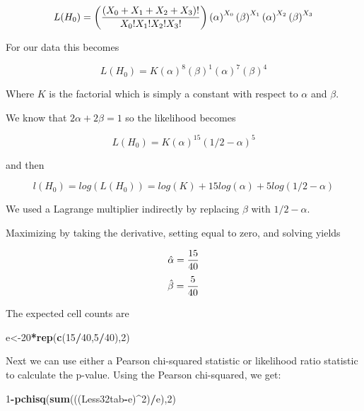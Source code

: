 \documentclass[]{book}
\newenvironment{Shaded}{\begin{snugshade}}{\end{snugshade}}
\newcommand{\KeywordTok}[1]{\textcolor[rgb]{0.13,0.29,0.53}{\textbf{#1}}}
\newcommand{\DecValTok}[1]{\textcolor[rgb]{0.00,0.00,0.81}{#1}}
\newcommand{\OperatorTok}[1]{\textcolor[rgb]{0.81,0.36,0.00}{\textbf{#1}}}
\newcommand{\NormalTok}[1]{#1}
\theoremstyle{definition}
\theoremstyle{definition}
\theoremstyle{definition}
\theoremstyle{remark}
\begin{document}
\[L(H_{0})= \left( {\left(X_{0}+X_{1}+X_{2}+X_{3} \right)! \over X_{0}!X_{1}!X_{2}!X_{3}!} \right) \left( \alpha \right)^{X_{0}} \left( \beta \right)^{X_{1}}\left( \alpha \right)^{X_{2}}\left( \beta \right)^{X_{3}}\]

For our data this becomes

\[L(H_{0})= K \left( \alpha \right)^{8} \left( \beta \right)^{1}\left( \alpha \right)^{7}\left( \beta \right)^{4}\]

Where \(K\) is the factorial which is simply a constant with respect to
\(\alpha\) and \(\beta\).

We know that \(2 \alpha + 2 \beta = 1\) so the likelihood becomes

\[L(H_{0})= K \left( \alpha \right)^{15} \left( 1/2 - \alpha \right)^{5}\]

and then

\[l(H_{0})= log(L(H_{0}))=log(K)+15log(\alpha)+5log( 1/2 - \alpha )\]

We used a Lagrange multiplier indirectly by replacing \(\beta\) with
\(1/2 - \alpha\).

Maximizing by taking the derivative, setting equal to zero, and solving
yields

\[\hat{\alpha}={15 \over 40}\] \[\hat{\beta}={5 \over 40}\]

The expected cell counts are

\begin{Shaded}
\begin{Highlighting}[]
\NormalTok{e<-}\DecValTok{20}\OperatorTok{*}\KeywordTok{rep}\NormalTok{(}\KeywordTok{c}\NormalTok{(}\DecValTok{15}\OperatorTok{/}\DecValTok{40}\NormalTok{,}\DecValTok{5}\OperatorTok{/}\DecValTok{40}\NormalTok{),}\DecValTok{2}\NormalTok{)}
\end{Highlighting}
\end{Shaded}

Next we can use either a Pearson chi-squared statistic or likelihood
ratio statistic to calculate the p-value. Using the Pearson chi-squared,
we get:

\begin{Shaded}
\begin{Highlighting}[]
\DecValTok{1}\OperatorTok{-}\KeywordTok{pchisq}\NormalTok{(}\KeywordTok{sum}\NormalTok{(((Less32tab}\OperatorTok{-}\NormalTok{e)}\OperatorTok{^}\DecValTok{2}\NormalTok{)}\OperatorTok{/}\NormalTok{e),}\DecValTok{2}\NormalTok{)}
\end{Highlighting}
\end{Shaded}
\end{document}
